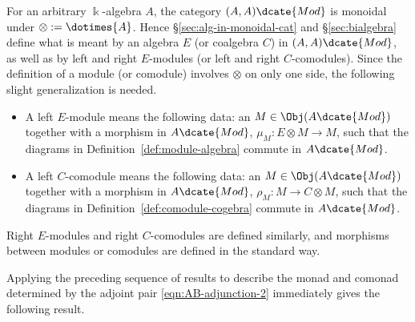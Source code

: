 \begin{definition}\label{def:cogebroid}
	 
	For an arbitrary $\Bbbk$-algebra $A$, the category
	$(A,A)\dcate{Mod}$ is monoidal under $\otimes:=\dotimes{A}$. Hence
	\S\ref{sec:alg-in-monoidal-cat} and \S\ref{sec:bialgebra} define what is
	meant by an algebra $E$ (or coalgebra $C$) in $(A,A)\dcate{Mod}$, as well
	as by left and right $E$-modules (or left and right $C$-comodules). Since
	the definition of a module (or comodule) involves $\otimes$ on only one
	side, the following slight generalization is needed.
	\begin{itemize}
		\item A left $E$-module means the following data: an
		$M\in\Obj(A\dcate{Mod})$ together with a morphism in $A\dcate{Mod}$,
		$\mu_M:E\otimes M\to M$, such that the diagrams in
		Definition~\ref{def:module-algebra} commute in $A\dcate{Mod}$.

		\item A left $C$-comodule means the following data: an
		$M\in\Obj(A\dcate{Mod})$ together with a morphism in $A\dcate{Mod}$,
		$\rho_M:M\to C\otimes M$, such that the diagrams in
		Definition~\ref{def:comodule-cogebra} commute in $A\dcate{Mod}$.
	\end{itemize}
	Right $E$-modules and right $C$-comodules are defined similarly, and
	morphisms between modules or comodules are defined in the standard way.
\end{definition}

Applying the preceding sequence of results to describe the monad and comonad
determined by the adjoint pair \eqref{eqn:AB-adjunction-2} immediately gives
the following result.

